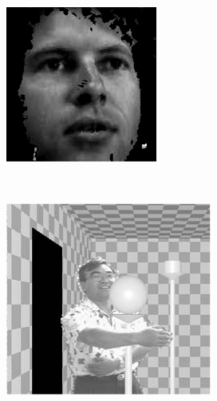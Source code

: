 \begin{figure}
\begin{subfigure}[b]{0.2\textwidth}
    \caption{}
  \end{subfigure}
  ~
  \begin{subfigure}[b]{0.2\textwidth}
    \centering
    \includegraphics[width=\textwidth]{images/synthesized-face.png}
    \caption{}
  \end{subfigure}
  ~
  \begin{subfigure}[b]{0.2\textwidth}
    \centering
    \includegraphics[width=\textwidth]{images/z-key.png}
    \caption{}
  \end{subfigure}


\end{figure}
